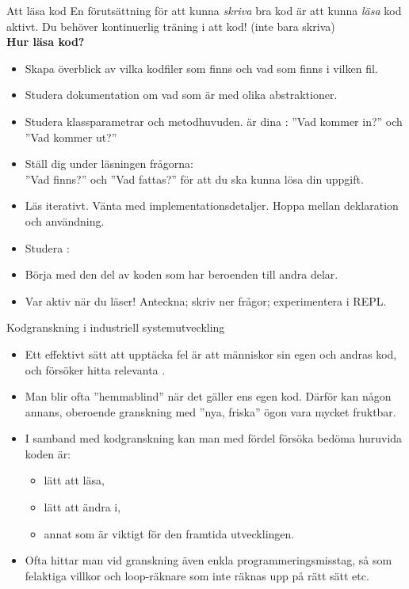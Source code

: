 


\begin{Slide}{Att läsa kod} \SlideFontSmall
  En förutsättning för att kunna \emph{skriva} bra kod är att kunna \emph{läsa} kod aktivt. Du behöver kontinuerlig träning i att  kod! (inte bara skriva)\\ \vspace{0.5em}\textbf{Hur läsa kod?}
  \pause
  \begin{itemize}\SlideFontSmall
    \item Skapa överblick av vilka kodfiler som finns och vad som finns i vilken fil.
    \item Studera dokumentation om vad som är  med olika abstraktioner.
    \item Studera klassparametrar och metodhuvuden.  är dina : ''Vad kommer in?'' och ''Vad kommer ut?''
    \item Ställ dig under läsningen frågorna: \\ ''Vad finns?'' och ''Vad fattas?'' för att du ska kunna lösa din uppgift.
    \item Läs iterativt. Vänta med implementationsdetaljer. Hoppa mellan deklaration och användning.
    \item Studera : 
    \item Börja med den del av koden som har  beroenden till andra delar.
    \item Var aktiv när du läser! Anteckna; skriv ner frågor; experimentera i REPL.
  \end{itemize}
\end{Slide}

\begin{Slide}{Kodgranskning i industriell systemutveckling}
\begin{itemize}
\item Ett effektivt sätt att upptäcka fel är att människor  sin egen och andras kod, och försöker hitta relevanta . 
\item Man blir ofta ''hemmablind'' när det gäller ens egen kod. Därför kan någon annans, oberoende granskning med ''nya, friska'' ögon vara mycket fruktbar. 
\item I samband med kodgranskning kan man med fördel försöka bedöma  huruvida koden är:
\begin{itemize}
\item lätt att läsa, 
\item lätt att ändra i,  
\item annat som är viktigt för den framtida utvecklingen.
\end{itemize}
\item Ofta hittar man vid granskning även enkla programmeringsmisstag, så som felaktiga villkor och loop-räknare som inte räknas upp på rätt sätt etc.
\end{itemize}
\end{Slide}


